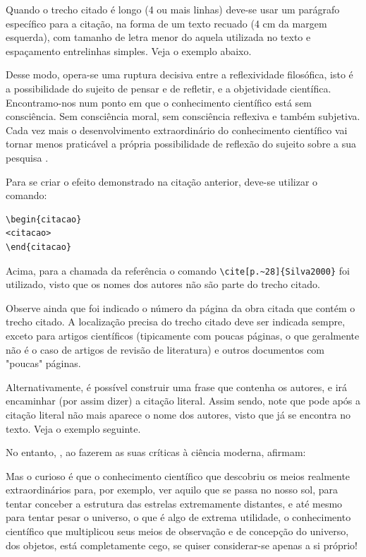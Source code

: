 \begin{apendicesenv}
Quando o trecho citado é longo (4 ou mais linhas) deve-se usar um parágrafo específico para a citação, na forma de um texto recuado (4 cm da margem esquerda), com tamanho de letra menor do aquela utilizada no texto e espaçamento entrelinhas simples. Veja o exemplo abaixo.

\begin{citacao}
	Desse modo, opera-se uma ruptura decisiva entre a reflexividade filosófica, isto é a possibilidade do sujeito de pensar e de refletir, e a objetividade científica. 	Encontramo-nos num ponto em que o conhecimento científico está sem consciência. Sem consciência moral, sem consciência reflexiva e também subjetiva. Cada vez mais o desenvolvimento extraordinário do conhecimento científico vai tornar menos praticável a própria possibilidade de reflexão do sujeito sobre a sua pesquisa \cite[p.~28]{Silva2000}.
\end{citacao}

Para se criar o efeito demonstrado na citação anterior, deve-se utilizar o comando:

\begin{verbatim}
\begin{citacao}
<citacao>
\end{citacao}
\end{verbatim}

Acima, para a chamada da referência o comando \verb|\cite[p.~28]{Silva2000}| foi utilizado, visto que os nomes dos autores não são parte do trecho citado.

Observe ainda que foi indicado o número da página da obra citada que contém o trecho citado. A localização precisa do trecho citado deve ser indicada sempre, exceto para artigos científicos (tipicamente com poucas páginas, o que geralmente não é o caso de artigos de revisão de literatura) e outros documentos com "poucas"{} páginas.

Alternativamente, é possível construir uma frase que contenha os autores, e irá encaminhar (por assim dizer) a citação literal. Assim sendo, note que pode após a citação literal não mais aparece o nome dos autores, visto que já se encontra no texto. Veja o exemplo seguinte.

No entanto, , ao fazerem as suas críticas à ciência moderna, afirmam:

\begin{citacao}
	Mas o curioso é que o conhecimento científico que descobriu os meios realmente extraordinários para, por exemplo, ver aquilo que se passa no nosso sol, para tentar conceber a estrutura das estrelas extremamente distantes, e até mesmo para tentar pesar o universo, o que é algo de extrema utilidade, o conhecimento científico que multiplicou seus meios de observação e de concepção do universo, dos objetos, está completamente cego, se quiser considerar-se apenas a si próprio!
\end{citacao}



\end{apendicesenv}
